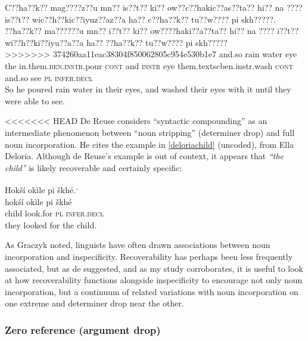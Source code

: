 \documentclass[output=paper]{LSP/langsci}
\begin{document}
\ea\label{lakhotaeye}
 	C??ha??k?? mag????z??u mn?? is??t?? ki?? ow??c??hakic??as??ta?? hi?? na ???? is??t?? wic??h??kic??iyuz??az??a ha?? c??ha??k?? tu??w???? pi skh?????.\footnotemark\\
\gll	??ha??k??	ma??????u	mn??	i??t??	ki??	ow????haki??a??ta??			hi??			na	????			i??t??		wi??h??ki??iyu??a??a			ha??			??ha??k??		tu??w????	pi		skh?????\\
>>>>>>> 374260aa11eac38304f850062805c954c530b1e7
	and.so	rain		water	eye	the	in.them.\textsc{ben.instr}.pour	\textsc{cont}	and	\textsc{instr}	eye		them.textsc{ben.instr}.wash	\textsc{cont}	and.so	see		\textsc{pl}	\textsc{infer.decl}\\
\glt	So he poured rain water in their eyes, and washed their eyes with it until they were able to see.
\z

<<<<<<< HEAD
De Reuse considers “syntactic compounding” as an intermediate phenomenon between “noun stripping” (determiner drop) and full noun incorporation. He cites the example in \ref{deloriachild} (uncoded), from Ella Deloria. Although de Reuse’s example is out of context, it appears that \emph{“the child”} is likely recoverable and certainly specific:

\ea\label{deloriachild}
 	Hokší okìle pi škhé.\footnotemark\textsuperscript{,} \footnotemark\\
\gll	hokší		okìle		pi			škhé\\
	child		look.for	\textsc{pl}		\textsc{infer.decl}\\
\glt	they looked for the child. 
\z

	As Graczyk noted, linguists have often drawn associations between noun incorporation and inspecificity. Recoverability has perhaps been less frequently associated, but as de \citet{Reuse1994} suggested, and as my study corroborates, it is useful to look at how recoverability functions alongside inspecificity to encourage not only noun incorporation, but a continuum of related variations with noun incorporation on one extreme and determiner drop near the other.
	
\subsubsection{Zero reference (argument drop)}\label{zeroreference}
\end{document}

